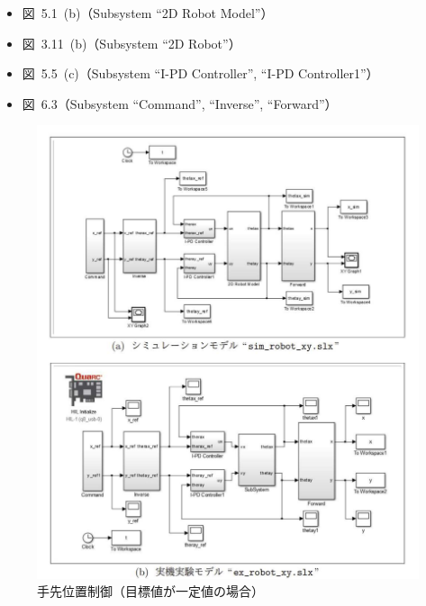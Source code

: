 \begin{itemize}
  \item 図~5.1~(b)（Subsystem ``2D Robot Model''）
  \item 図~3.11~(b)（Subsystem ``2D Robot''）
  \item 図~5.5~(c)（Subsystem ``I-PD Controller'', ``I-PD Controller1''）
  \item 図~6.3（Subsystem ``Command'', ``Inverse'', ``Forward''）
\end{itemize}

\begin{figure}[h]
    \centering
    \includegraphics[width=0.85\linewidth]{figure/robot_xy_models.pdf}
    \caption{手先位置制御（目標値が一定値の場合）}
    \label{fig:sim_robot_xy}
\end{figure}

